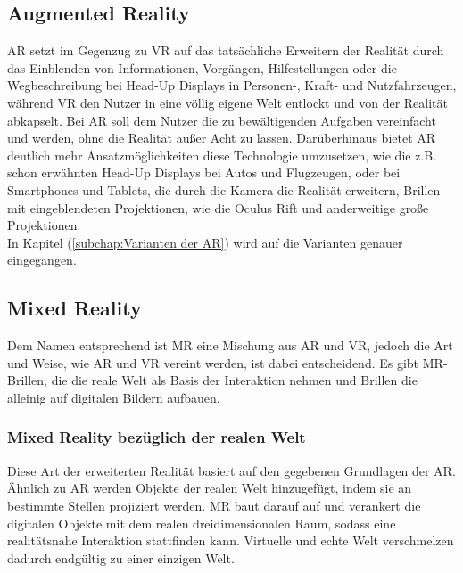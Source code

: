\subsection*{Augmented Reality}
\ac{AR} setzt im Gegenzug zu \ac{VR} auf das tatsächliche Erweitern der Realität durch das Einblenden von Informationen, Vorgängen, Hilfestellungen
oder die Wegbeschreibung bei Head-Up Displays in Personen-, Kraft- und Nutzfahrzeugen, während \acl{VR} den Nutzer in eine völlig eigene 
Welt entlockt und von der Realität abkapselt. Bei \acs{AR} soll dem Nutzer die zu bewältigenden Aufgaben vereinfacht und 
werden, ohne die Realität außer Acht zu lassen. Darüberhinaus bietet \acl{AR} deutlich mehr Ansatzmöglichkeiten diese Technologie 
umzusetzen, wie die z.B. schon erwähnten Head-Up Displays bei Autos und Flugzeugen, oder bei Smartphones und Tablets, die durch die Kamera 
die Realität erweitern, Brillen mit eingeblendeten Projektionen, wie die Oculus Rift und anderweitige große Projektionen. 
\\ 
In Kapitel (\ref{subchap:Varianten der AR}) wird auf die Varianten genauer eingegangen. 

\subsection*{Mixed Reality}
Dem Namen entsprechend ist \ac{MR} eine Mischung aus \acl{AR} und \acl{VR}, jedoch die Art und Weise, wie \acs{AR} und \acs{VR} vereint 
werden, ist dabei entscheidend. Es gibt \acs{MR}-Brillen, die die reale Welt als Basis der Interaktion nehmen und Brillen die alleinig 
auf digitalen Bildern aufbauen. \cite{mr.2018o}
\subsubsection*{Mixed Reality bezüglich der realen Welt}
Diese Art der erweiterten Realität basiert auf den gegebenen Grundlagen der \acs{AR}. Ähnlich zu \acl{AR} werden Objekte der realen Welt 
hinzugefügt, indem sie an bestimmte Stellen projiziert werden. \acl{MR} baut darauf auf und verankert die digitalen Objekte mit dem realen
dreidimensionalen Raum, sodass eine realitätsnahe Interaktion stattfinden kann. Virtuelle und echte Welt verschmelzen dadurch endgültig zu 
einer einzigen Welt. 

